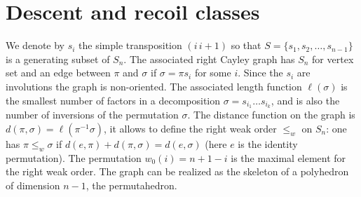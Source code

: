 \documentclass[11pt,a4paper]{amsart}
\theoremstyle{contraction}
\begin{document}
\section{Descent and recoil classes}We denote by $s_i$ the simple transposition $(i\, i+1)$ so that $S=\{s_1,s_2,\ldots,s_{n-1}\}$ is  a generating subset  of $S_n$. The associated right Cayley graph  has $S_n$  for vertex set and an edge between $\pi$ and $\sigma$ if $\sigma=\pi s_i$ for some $i$. Since the $s_i$ are involutions the graph is non-oriented. The associated length function $\ell(\sigma)$ is the smallest number of factors in a decomposition $\sigma=s_{i_1}\ldots s_{i_k}$, and is also the number of inversions of the permutation $\sigma$. The distance function on the graph is $d(\pi,\sigma)=\ell(\pi^{-1}\sigma)$, it allows to define the  
right weak order $\leq_w$ on $S_n$:
one has $\pi\leq_w\sigma$ if $d(e,\pi)+d(\pi,\sigma)=d(e,\sigma)$ (here $e$ is the identity permutation). The permutation  $w_0(i)=n+1-i$ is the maximal element for the right weak order. The graph can be realized as the skeleton of a polyhedron of dimension $n-1$, the permutahedron.
\end{document}
